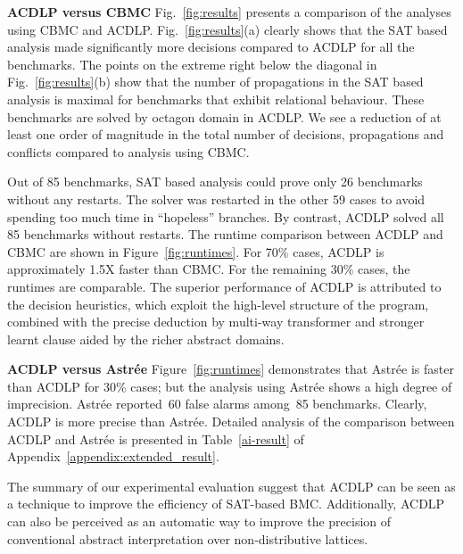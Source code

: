 


%
\textbf{ACDLP versus CBMC}
Fig.~\ref{fig:results} presents a comparison of the analyses using CBMC
and ACDLP.  Fig.~\ref{fig:results}(a) clearly shows that the SAT based analysis 
made significantly more decisions compared to ACDLP for all the benchmarks. 
The points on the extreme right below the diagonal in
Fig.~\ref{fig:results}(b) show that the number of propagations in the SAT based 
analysis is maximal for benchmarks that exhibit relational behaviour.  These
benchmarks are solved by octagon domain in ACDLP.  We see a reduction of at 
least one order of magnitude in the total number of decisions, propagations and conflicts compared 
to analysis using CBMC.  

Out of 85 benchmarks, SAT based analysis could prove only 26
benchmarks without any restarts.  The solver was restarted in the other 59 
cases to avoid spending too much time in ``hopeless'' branches.  By contrast, 
ACDLP solved all 85 benchmarks without restarts.  
The runtime comparison between ACDLP and CBMC are shown in 
Figure~\ref{fig:runtimes}.  For 70\% cases, ACDLP is approximately 1.5X 
faster than CBMC. For the remaining 30\% cases, the runtimes are comparable. 
The superior performance of ACDLP is attributed to the decision heuristics, 
which exploit the high-level structure of the program, combined with the 
precise deduction by multi-way transformer and stronger learnt clause aided 
by the richer abstract domains.  

%
\textbf{ACDLP versus Astr{\'e}e}
Figure~\ref{fig:runtimes} demonstrates that Astr{\'e}e is faster than ACDLP for
30\% cases; but the analysis using Astr{\'e}e shows a high degree of 
imprecision.  Astr{\'e}e reported~60 false alarms among~85 benchmarks.  Clearly,
ACDLP is more precise than Astr{\'e}e. Detailed analysis of the comparison
between ACDLP and Astr{\'e}e is presented in Table~\ref{ai-result} of 
Appendix~\ref{appendix:extended_result}.  


The summary of our experimental evaluation suggest that ACDLP can be seen as a
technique to improve the efficiency of SAT-based BMC.  Additionally, ACDLP can
also be perceived as an automatic way to improve the precision of conventional
abstract interpretation over non-distributive lattices. 
